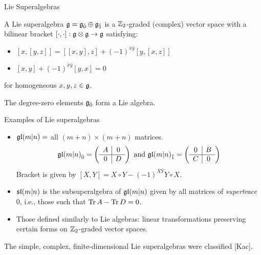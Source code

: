 \documentclass{beamer}
\begin{document}
\begin{frame}{Lie Superalgebras}
  \pause
  \begin{definition}
    A Lie superalgebra $\g = \even{\g} \oplus \odd{\g}$ is a $\ZZ_2$-graded (complex) vector space with a bilinear bracket $[\cdot,\cdot]: \g \otimes \g \to \g$ satisfying: \pause
    \begin{itemize}
    \item $[x,[y,z]] = [[x,y],z] + (-1)^{\bar x \bar y} [y,[x,z]]$\pause
    \item $[x,y] + (-1)^{\bar x \bar y} [y,x] = 0$
    \end{itemize}
    for homogeneous $x,y,z \in \g$.
  \end{definition}\pause
  \begin{example}
    The degree-zero elements $\even{\g}$ form a Lie algebra.
  \end{example}

\end{frame}

\begin{frame}{Examples of Lie superalgebras}
  \begin{itemize}
    \pause
  \item $\gl(m|n) = $ all $(m+n) \times (m+n)$ matrices.
    \[
\even{\gl(m|n)} = \left(
  \begin{array}{c|c}
    A & 0 \\
    \hline
    0 & D
  \end{array}
\right)
\text{ and } \odd{\gl(m|n)} = \left(
  \begin{array}{c|c}
    0 & B \\
    \hline
    C & 0
  \end{array}
\right)
\]
\pause
  Bracket is given by $[X,Y] = X \circ Y - (-1)^{\bar X \bar Y} Y \circ X$.
  \pause\item $\sl(m|n)$ is the subsuperalgebra of $\gl(m|n)$ given by all matrices of \emph{supertrace} 0, i.e., those such that $\Tr A - \Tr D = 0$.
  \pause\item Those defined similarly to Lie algebras: linear transformations preserving certain forms on $\ZZ_2$-graded vector spaces.
  \end{itemize}
\pause
  The simple, complex, finite-dimensional Lie superalgebras were classified [Kac].
\end{frame}
\end{document}
